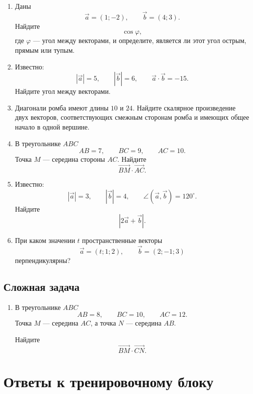 \documentclass[a4paper,12pt]{article}
\newcommand{\vect}[1]{\overrightarrow{#1}}
\newcommand{\vct}[1]{\vec{#1}}
\begin{document}
\begin{enumerate}[label=\textbf{\arabic*.},resume]

\item
Даны
\[
\vct a=(1;-2),
\qquad
\vct b=(4;3).
\]
Найдите
\[
\cos\varphi,
\]
где $\varphi$ --- угол между векторами, и определите, является ли этот
угол острым, прямым или тупым.

\item
Известно:
\[
|\vct a|=5,
\qquad
|\vct b|=6,
\qquad
\vct a\cdot\vct b=-15.
\]
Найдите угол между векторами.

\item
Диагонали ромба имеют длины $10$ и $24$.
Найдите скалярное произведение двух векторов, соответствующих
смежным сторонам ромба и имеющих общее начало в одной вершине.

\item
В треугольнике $ABC$
\[
AB=7,\qquad BC=9,\qquad AC=10.
\]
Точка $M$ --- середина стороны $AC$.
Найдите
\[
\vect{BM}\cdot\vect{AC}.
\]

\item
Известно:
\[
|\vct a|=3,
\qquad
|\vct b|=4,
\qquad
\angle(\vct a,\vct b)=120^\circ.
\]
Найдите
\[
|2\vct a+\vct b|.
\]

\item
При каком значении $t$ пространственные векторы
\[
\vct a=(t;1;2),
\qquad
\vct b=(2;-1;3)
\]
перпендикулярны?

\end{enumerate}

\subsection*{\color{accent}Сложная задача}

\begin{enumerate}[label=\textbf{\arabic*.},resume]

\item
В треугольнике $ABC$
\[
AB=8,\qquad BC=10,\qquad AC=12.
\]
Точка $M$ --- середина $AC$, а точка $N$ --- середина $AB$.

Найдите
\[
\vect{BM}\cdot\vect{CN}.
\]

\end{enumerate}


\clearpage
\section*{\color{darkaccent}Ответы к тренировочному блоку}
\end{document}
